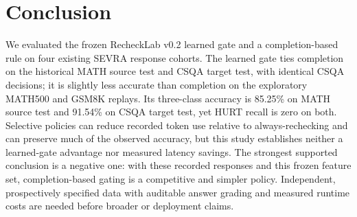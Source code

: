 \documentclass[conference]{IEEEtran}
\begin{document}
\section{Conclusion}
We evaluated the frozen RecheckLab v0.2 learned gate and a completion-based rule on four existing SEVRA response cohorts. The learned gate ties completion on the historical MATH source test and CSQA target test, with identical CSQA decisions; it is slightly less accurate than completion on the exploratory MATH500 and GSM8K replays. Its three-class accuracy is 85.25\% on MATH source test and 91.54\% on CSQA target test, yet HURT recall is zero on both. Selective policies can reduce recorded token use relative to always-rechecking and can preserve much of the observed accuracy, but this study establishes neither a learned-gate advantage nor measured latency savings. The strongest supported conclusion is a negative one: with these recorded responses and this frozen feature set, completion-based gating is a competitive and simpler policy. Independent, prospectively specified data with auditable answer grading and measured runtime costs are needed before broader or deployment claims.


\balance

\end{document}
